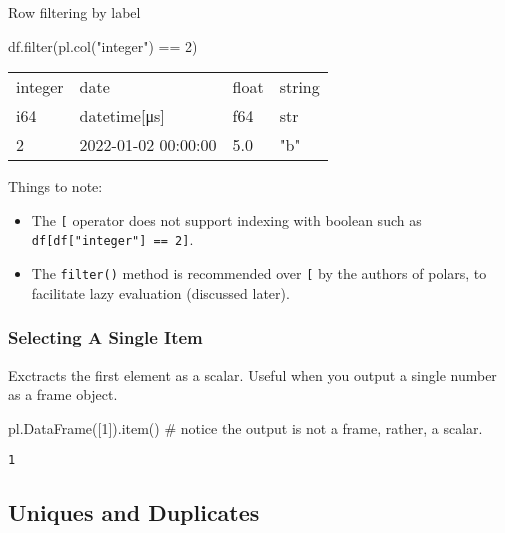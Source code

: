 \documentclass[
  letterpaper,
  DIV=11,
  numbers=noendperiod]{scrartcl}
\newenvironment{Shaded}{\begin{snugshade}}{\end{snugshade}}
\newcommand{\BuiltInTok}[1]{\textcolor[rgb]{0.00,0.23,0.31}{#1}}
\newcommand{\CommentTok}[1]{\textcolor[rgb]{0.37,0.37,0.37}{#1}}
\newcommand{\DecValTok}[1]{\textcolor[rgb]{0.68,0.00,0.00}{#1}}
\newcommand{\NormalTok}[1]{\textcolor[rgb]{0.00,0.23,0.31}{#1}}
\newcommand{\OperatorTok}[1]{\textcolor[rgb]{0.37,0.37,0.37}{#1}}
\newcommand{\StringTok}[1]{\textcolor[rgb]{0.13,0.47,0.30}{#1}}
\providecommand{\tightlist}{%
  \setlength{\itemsep}{0pt}\setlength{\parskip}{0pt}}\usepackage{longtable,booktabs,array}
\begin{document}
Row filtering by label

\begin{Shaded}
\begin{Highlighting}[]
\NormalTok{df.}\BuiltInTok{filter}\NormalTok{(pl.col(}\StringTok{"integer"}\NormalTok{) }\OperatorTok{==} \DecValTok{2}\NormalTok{)}
\end{Highlighting}
\end{Shaded}

\begin{longtable}[]{@{}llll@{}}
\toprule()
integer & date & float & string \\
i64 & datetime{[}μs{]} & f64 & str \\
\midrule()
\endhead
2 & 2022-01-02 00:00:00 & 5.0 & "b" \\
\bottomrule()
\end{longtable}

Things to note:

\begin{itemize}
\tightlist
\item
  The \texttt{{[}} operator does not support indexing with boolean such
  as \texttt{df{[}df{[}"integer"{]}\ ==\ 2{]}}.
\item
  The \texttt{filter()} method is recommended over \texttt{{[}} by the
  authors of polars, to facilitate lazy evaluation (discussed later).
\end{itemize}

\hypertarget{selecting-a-single-item}{%
\subsubsection{Selecting A Single Item}\label{selecting-a-single-item}}

Exctracts the first element as a scalar. Useful when you output a single
number as a frame object.

\begin{Shaded}
\begin{Highlighting}[]
\NormalTok{pl.DataFrame([}\DecValTok{1}\NormalTok{]).item() }\CommentTok{\# notice the output is not a frame, rather, a scalar.}
\end{Highlighting}
\end{Shaded}

\begin{verbatim}
1
\end{verbatim}

\hypertarget{uniques-and-duplicates-1}{%
\subsection{Uniques and Duplicates}\label{uniques-and-duplicates-1}}
\end{document}
